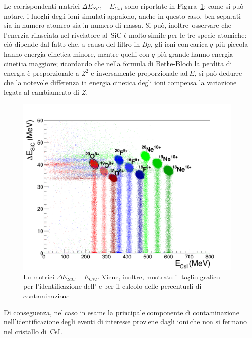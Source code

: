 Le corrispondenti matrici $\Delta E_{SiC} - E_{CsI}$ sono riportate in Figura~\ref{fig:deltaE_Ecsi_altaE}: come si può notare, i luoghi degli ioni simulati appaiono, anche in questo caso, ben separati sia in numero atomico sia in numero di massa.
Si può, inoltre, osservare che l'energia rilasciata nel rivelatore al~SiC è molto simile per le tre specie atomiche: 
ciò dipende dal fatto che, a causa del filtro in $B \rho$, gli ioni con carica $q$ più piccola hanno energia cinetica minore, mentre quelli con $q$ più grande hanno energia cinetica maggiore; ricordando che nella formula di Bethe-Bloch la perdita di energia è proporzionale a $Z^2$ e inversamente proporzionale ad $E$, si può dedurre che la notevole differenza in energia cinetica degli ioni compensa la variazione legata al cambiamento di $Z$.
\begin{figure} [!p]
	\centering
	\includegraphics[width=\textwidth, keepaspectratio]{Grafici_Tesi2/PID/deltaE_Ecsi_quadrata_taglio_label.png}
	\caption{Le matrici $\Delta E_{SiC} - E_{CsI}$. Viene, inoltre, mostrato il taglio grafico per l'identificazione dell' e per il calcolo delle percentuali di contaminazione.} \label{fig:deltaE_Ecsi_altaE}
\end{figure}
Di conseguenza, nel caso in esame la principale componente di contaminazione nell'identificazione degli eventi di interesse proviene dagli ioni che non si fermano nel cristallo di~CsI.

